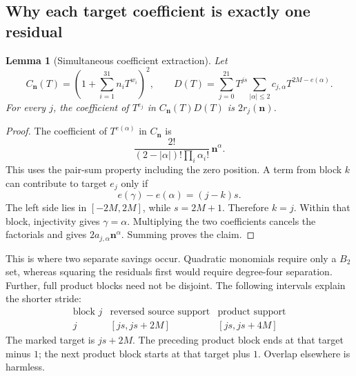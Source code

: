 \documentclass[11pt,a4paper]{article}
\newtheorem{lemma}[theorem]{Lemma}
\theoremstyle{remark}
\begin{document}
\subsection{Why each target coefficient is exactly one residual}
\begin{lemma}[Simultaneous coefficient extraction]\label{lem:extract}
Let
\[
C_{\mathbf n}(T)=\left(1+\sum_{i=1}^{31}n_iT^{w_i}\right)^2,\qquad
D(T)=\sum_{j=0}^{21}T^{js}
\sum_{|\alpha|\le2}c_{j,\alpha}T^{2M-e(\alpha)}.
\]
For every \(j\), the coefficient of \(T^{e_j}\) in
\(C_{\mathbf n}(T)D(T)\) is \(2r_j(\mathbf n)\).
\end{lemma}
\begin{proof}
The coefficient of \(T^{e(\alpha)}\) in \(C_{\mathbf n}\) is
\[
\frac{2!}{(2-|\alpha|)!\prod_i\alpha_i!}\,\mathbf n^\alpha.
\]
This uses the pair-sum property including the zero position. A term
from block \(k\) can contribute to target \(e_j\) only if
\[
e(\gamma)-e(\alpha)=(j-k)s.
\]
The left side lies in \([-2M,2M]\), while \(s=2M+1\).
Therefore \(k=j\). Within that block, injectivity gives
\(\gamma=\alpha\). Multiplying the two coefficients cancels the
factorials and gives \(2a_{j,\alpha}\mathbf n^\alpha\).
Summing proves the claim.
\end{proof}
This is where two separate savings occur. Quadratic monomials require
only a \(B_2\) set, whereas squaring the residuals first would require
degree-four separation. Further, full product blocks need not be
disjoint. The following intervals explain the shorter stride:
\[
\begin{array}{c|c|c}
\text{block }j & \text{reversed source support} & \text{product support}\\
\hline
j &[js,js+2M]&[js,js+4M]
\end{array}
\]
The marked target is \(js+2M\). The preceding product block ends at
that target minus \(1\); the next product block starts at that target
plus \(1\). Overlap elsewhere is harmless.
\end{document}
